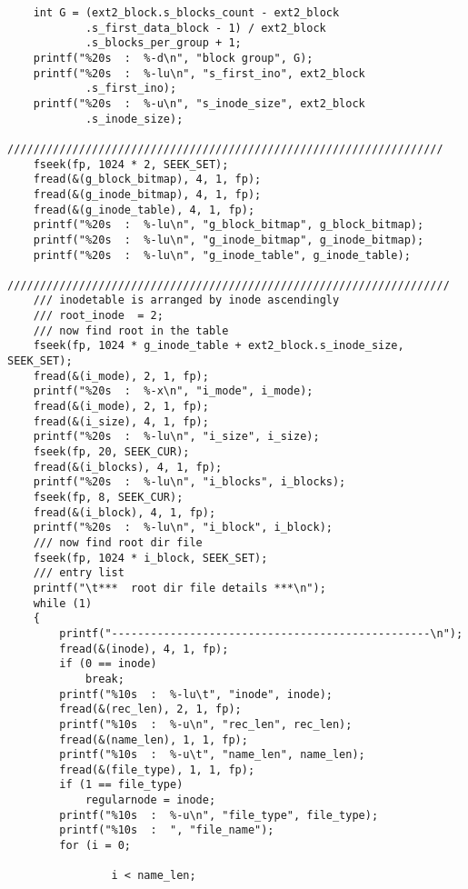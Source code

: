 \documentclass[UTF8]{ctexart}
\begin{document}
\begin{verbatim}
    int G = (ext2_block.s_blocks_count - ext2_block
            .s_first_data_block - 1) / ext2_block
            .s_blocks_per_group + 1;
    printf("%20s  :  %-d\n", "block group", G);
    printf("%20s  :  %-lu\n", "s_first_ino", ext2_block
            .s_first_ino);
    printf("%20s  :  %-u\n", "s_inode_size", ext2_block
            .s_inode_size);
    ///////////////////////////////////////////////////////////////////
    fseek(fp, 1024 * 2, SEEK_SET);
    fread(&(g_block_bitmap), 4, 1, fp);
    fread(&(g_inode_bitmap), 4, 1, fp);
    fread(&(g_inode_table), 4, 1, fp);
    printf("%20s  :  %-lu\n", "g_block_bitmap", g_block_bitmap);
    printf("%20s  :  %-lu\n", "g_inode_bitmap", g_inode_bitmap);
    printf("%20s  :  %-lu\n", "g_inode_table", g_inode_table);
    ////////////////////////////////////////////////////////////////////
    /// inodetable is arranged by inode ascendingly
    /// root_inode  = 2;
    /// now find root in the table
    fseek(fp, 1024 * g_inode_table + ext2_block.s_inode_size, SEEK_SET);
    fread(&(i_mode), 2, 1, fp);
    printf("%20s  :  %-x\n", "i_mode", i_mode);
    fread(&(i_mode), 2, 1, fp);
    fread(&(i_size), 4, 1, fp);
    printf("%20s  :  %-lu\n", "i_size", i_size);
    fseek(fp, 20, SEEK_CUR);
    fread(&(i_blocks), 4, 1, fp);
    printf("%20s  :  %-lu\n", "i_blocks", i_blocks);
    fseek(fp, 8, SEEK_CUR);
    fread(&(i_block), 4, 1, fp);
    printf("%20s  :  %-lu\n", "i_block", i_block);
    /// now find root dir file
    fseek(fp, 1024 * i_block, SEEK_SET);
    /// entry list
    printf("\t***  root dir file details ***\n");
    while (1)
    {
        printf("-------------------------------------------------\n");
        fread(&(inode), 4, 1, fp);
        if (0 == inode)
            break;
        printf("%10s  :  %-lu\t", "inode", inode);
        fread(&(rec_len), 2, 1, fp);
        printf("%10s  :  %-u\n", "rec_len", rec_len);
        fread(&(name_len), 1, 1, fp);
        printf("%10s  :  %-u\t", "name_len", name_len);
        fread(&(file_type), 1, 1, fp);
        if (1 == file_type)
            regularnode = inode;
        printf("%10s  :  %-u\n", "file_type", file_type);
        printf("%10s  :  ", "file_name");
        for (i = 0;

                i < name_len;


\end{verbatim}
\end{document}

